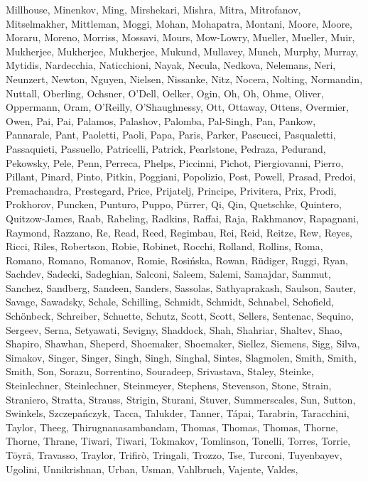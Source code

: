 \documentclass{aa}
\begin{document}
\begin{thebibliography}{242}
{  Millhouse, Minenkov, Ming, Mirshekari, Mishra, Mitra, Mitrofanov,
  Mitselmakher, Mittleman, Moggi, Mohan, Mohapatra, Montani, Moore, Moore,
  Moraru, Moreno, Morriss, Mossavi, Mours, Mow-Lowry, Mueller, Mueller, Muir,
  Mukherjee, Mukherjee, Mukherjee, Mukund, Mullavey, Munch, Murphy, Murray,
  Mytidis, Nardecchia, Naticchioni, Nayak, Necula, Nedkova, Nelemans, Neri,
  Neunzert, Newton, Nguyen, Nielsen, Nissanke, Nitz, Nocera, Nolting,
  Normandin, Nuttall, Oberling, Ochsner, O’Dell, Oelker, Ogin, Oh, Oh, Ohme,
  Oliver, Oppermann, Oram, O’Reilly, O’Shaughnessy, Ott, Ottaway, Ottens,
  Overmier, Owen, Pai, Pai, Palamos, Palashov, Palomba, Pal-Singh, Pan, Pankow,
  Pannarale, Pant, Paoletti, Paoli, Papa, Paris, Parker, Pascucci, Pasqualetti,
  Passaquieti, Passuello, Patricelli, Patrick, Pearlstone, Pedraza, Pedurand,
  Pekowsky, Pele, Penn, Perreca, Phelps, Piccinni, Pichot, Piergiovanni,
  Pierro, Pillant, Pinard, Pinto, Pitkin, Poggiani, Popolizio, Post, Powell,
  Prasad, Predoi, Premachandra, Prestegard, Price, Prijatelj, Principe,
  Privitera, Prix, Prodi, Prokhorov, Puncken, Punturo, Puppo, Pürrer, Qi, Qin,
  Quetschke, Quintero, Quitzow-James, Raab, Rabeling, Radkins, Raffai, Raja,
  Rakhmanov, Rapagnani, Raymond, Razzano, Re, Read, Reed, Regimbau, Rei, Reid,
  Reitze, Rew, Reyes, Ricci, Riles, Robertson, Robie, Robinet, Rocchi, Rolland,
  Rollins, Roma, Romano, Romano, Romanov, Romie, Rosińska, Rowan, Rüdiger,
  Ruggi, Ryan, Sachdev, Sadecki, Sadeghian, Salconi, Saleem, Salemi, Samajdar,
  Sammut, Sanchez, Sandberg, Sandeen, Sanders, Sassolas, Sathyaprakash,
  Saulson, Sauter, Savage, Sawadsky, Schale, Schilling, Schmidt, Schmidt,
  Schnabel, Schofield, Schönbeck, Schreiber, Schuette, Schutz, Scott, Scott,
  Sellers, Sentenac, Sequino, Sergeev, Serna, Setyawati, Sevigny, Shaddock,
  Shah, Shahriar, Shaltev, Shao, Shapiro, Shawhan, Sheperd, Shoemaker,
  Shoemaker, Siellez, Siemens, Sigg, Silva, Simakov, Singer, Singer, Singh,
  Singh, Singhal, Sintes, Slagmolen, Smith, Smith, Smith, Son, Sorazu,
  Sorrentino, Souradeep, Srivastava, Staley, Steinke, Steinlechner,
  Steinlechner, Steinmeyer, Stephens, Stevenson, Stone, Strain, Straniero,
  Stratta, Strauss, Strigin, Sturani, Stuver, Summerscales, Sun, Sutton,
  Swinkels, Szczepańczyk, Tacca, Talukder, Tanner, Tápai, Tarabrin,
  Taracchini, Taylor, Theeg, Thirugnanasambandam, Thomas, Thomas, Thomas,
  Thorne, Thorne, Thrane, Tiwari, Tiwari, Tokmakov, Tomlinson, Tonelli, Torres,
  Torrie, Töyrä, Travasso, Traylor, Trifirò, Tringali, Trozzo, Tse, Turconi,
  Tuyenbayev, Ugolini, Unnikrishnan, Urban, Usman, Vahlbruch, Vajente, Valdes,
}
\end{thebibliography}
\end{document}

